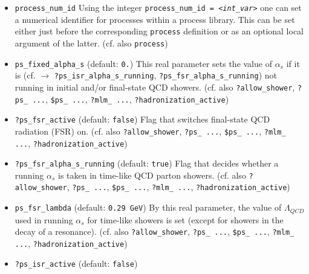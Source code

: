 \documentclass[12pt]{book}
\newcommand{\ttt}[1]{\texttt{#1}}
\newcommand{\oMega}{\texttt{O'Mega}}
\begin{document}
\begin{itemize}
(cf. \ttt{process\_num\_id}), the method how to generate the code for
the matrix element(s): \ttt{\$method}, possible methods are either
with the \oMega\ matrix element generator, using template matrix
elements with different normalizations, or completely internal matrix
element; for \oMega\ matrix elements there is also the possibility to
specify possible restrictions (cf. \ttt{\$restrictions}).
\item
\ttt{process\_num\_id} \newline
Using the integer \ttt{process\_num\_id = {\em <int\_var>}} one can set a
numerical identifier for processes within a process library. This can
be set either just before the corresponding \ttt{process} definition
or as an optional local argument of the latter. (cf. also \ttt{process})
\item
\ttt{ps\_fixed\_alpha\_s} \qquad (default: \ttt{0.}) \newline
This real parameter sets the value of $\alpha_s$ if it is (cf. $\to$
\ttt{?ps\_isr\_alpha\_s\_running}, \newline \ttt{?ps\_fsr\_alpha\_s\_running})
not running in initial and/or final-state QCD showers.  (cf. also
\ttt{?allow\_shower}, \ttt{?ps\_ ...}, \ttt{\$ps\_ ...}, \ttt{?mlm\_
...}, \ttt{?hadronization\_active})  
\item
\ttt{?ps\_fsr\_active} \qquad (default: \ttt{false}) \newline
Flag that switches final-state QCD radiation (FSR) on.  (cf. also
\ttt{?allow\_shower}, \ttt{?ps\_ ...}, \ttt{\$ps\_ ...}, \ttt{?mlm\_
...}, \ttt{?hadronization\_active})  
\item
\ttt{?ps\_fsr\_alpha\_s\_running} \qquad (default: \ttt{true})
\newline
Flag that decides whether a running $\alpha_s$ is taken in time-like
QCD parton showers. (cf. also \ttt{?allow\_shower}, \ttt{?ps\_ ...},
\ttt{\$ps\_ ...}, \ttt{?mlm\_ ...}, \ttt{?hadronization\_active}) 
\item
\ttt{ps\_fsr\_lambda} \qquad (default: \ttt{0.29 GeV}) \newline
By this real parameter, the value of $\Lambda_{QCD}$ used in running
$\alpha_s$ for time-like showers is set (except for showers in the
decay of a resonance). (cf. also \ttt{?allow\_shower}, \ttt{?ps\_
  ...}, \ttt{\$ps\_ ...}, \ttt{?mlm\_ ...}, \ttt{?hadronization\_active})  
\item
\ttt{?ps\_isr\_active} \qquad (default: \ttt{false}) \newline

\end{itemize}
\end{document}

